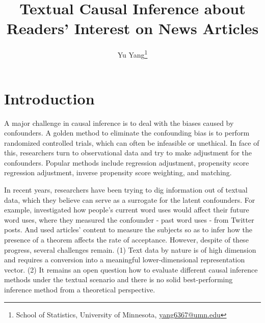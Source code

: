 \documentclass{article}
\title{Textual Causal Inference about Readers' Interest on News Articles}
\author{
	Yu Yang\thanks{School of Statistics, University of Minnesota, \href{mailto:yang6367@umn.edu}{yang6367@umn.edu}}
}
\date{}
\begin{document}
	\maketitle
	\vspace{-5em}
	
	\section{Introduction}
	
	A major challenge in causal inference is to deal with the biases caused by confounders. A golden method to eliminate the confounding bias is to perform randomized controlled trials, which can often be infeasible or unethical. In face of this, researchers turn to observational data and try to make adjustment for the confounders. Popular methods include regression adjustment, propensity score regression adjustment, inverse propensity score weighting, and matching. 
	
	In recent years, researchers have been trying to dig information out of textual data, which they believe can serve as a surrogate for the latent confounders. For example, \cite{olteanu2017distilling} investigated how people's current word uses would affect their future word uses, where they measured the confounder - past word uses - from Twitter posts. And \cite{veitch2020adapting} used articles' content to measure the subjects so as to infer how the presence of a theorem affects the rate of acceptance. However, despite of these progress, several challenges remain. (1) Text data by nature is of high dimension and requires a conversion into a meaningful lower-dimensional representation vector. (2) It remains an open question how to evaluate different causal inference methods under the textual scenario \parencite{keith2020text} and there is no solid best-performing inference method from a theoretical perspective. 
	
\end{document}
